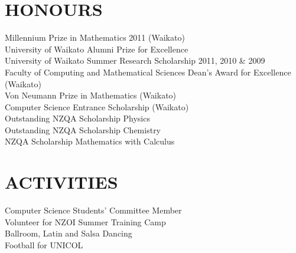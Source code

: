 \documentclass[margin,11pt]{res} %
\begin{document}
\begin{resume}
\section{HONOURS}
				Millennium Prize in Mathematics 2011 (Waikato) \\
				University of Waikato Alumni Prize for Excellence \\
				University of Waikato Summer Research Scholarship 2011, 2010 \& 2009 \\
				Faculty of Computing and Mathematical Sciences Dean's Award for Excellence (Waikato) \\
				Von Neumann Prize in Mathematics (Waikato) \\
				Computer Science Entrance Scholarship (Waikato) \\
				Outstanding NZQA Scholarship Physics \\
				Outstanding NZQA Scholarship Chemistry \\
				NZQA Scholarship Mathematics with Calculus \\


\section{ACTIVITIES}
				Computer Science Students' Committee Member \\
				Volunteer for NZOI Summer Training Camp \\
				Ballroom, Latin and Salsa Dancing \\
				Football for UNICOL \\


\end{resume}
\end{document}
